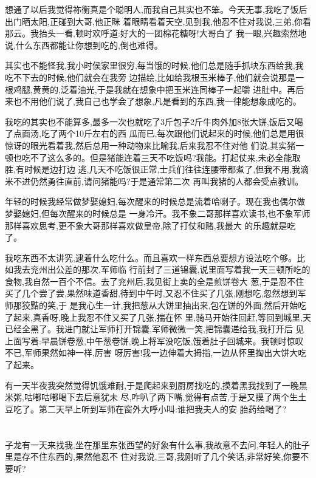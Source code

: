 ﻿\documentclass[12pt,twocolumn]{article}
\begin{document}
想通了以后我觉得祢衡真是个聪明人,而我自己其实也不笨。今天无事,我吃了饭后出门晒太阳,正碰到大哥,他正眯
着眼睛看着天空,见到我,他忍不住对我说,三弟,你看那云。我抬头一看,顿时欢呼道:好大的一团棉花糖呀!大哥白了
我一眼,兴趣索然地说,什么东西都能让你想到吃的,倒也难得。

其实也不能怪我,我小时侯家里很穷,每当饿的时候,他们总是随手抓块东西给我,我吃不下去的时候,他们就会在我旁
边描绘,比如给我根玉米棒子,他们就会说那是一根鸡腿,黄黄的,泛着油光,于是我就在想象中把玉米连同棒子一起嚼
进肚中。再后来也不用他们说了,我自己也学会了想象,凡是看到的东西,我一律能想象成吃的。

我吃的其实也不能算多,最多一次也就吃了3斤包子2斤牛肉外加8张大饼,饭后又喝了点面汤,吃了两个10斤左右的西
瓜而已,每次跟他们说起来的时候,他们总是用很惊讶的眼光看着我,然后总用一种动物来比喻我,后来我忍不住对他
们说,其实猪一顿也吃不了这么多的。但是猪能连着三天不吃饭吗?我能。打起仗来,未必全能取胜,有时候是边打边
逃,几天不吃饭很正常,士兵们往往连腰带都煮了,但我不用,我滴米不进仍然勇往直前,请问猪能吗?于是通常第二次
再叫我猪的人都会受点教训。

年轻的时候我经常做梦娶媳妇,每次醒来的时候总是流着哈喇子。现在我也偶尔做梦娶媳妇,但每次醒来的时候总是
一身冷汗。我不象二哥那样喜欢读书,也不象军师那样喜欢思考,更不象大哥那样喜欢做皇帝,除了打仗和赌,我最大
的乐趣就是吃了。

我吃东西不太讲究,逮着什么吃什么。而且喜欢一样东西总要想方设法吃个够。比如我去兖州出公差的那次,军师临
行前封了三道锦囊,说里面写着我一天三顿所吃的食物,我自然一百个不信。去了兖州后,我见街上卖的全是煎饼卷大
葱,于是忍不住买了几个尝了尝,果然味道香甜,待到中午时,又忍不住买了几张,刚想吃,忽然想到军师那狡黠的笑,于
是我心生一计,我把葱从大饼里抽出来,包在饼的外面,然后开始吃了起来,真香呀,晚上我忍不住又买了几张,揣在怀
里,骑马开始往回赶,等回到城里,天已经全黑了。我进门就让军师打开锦囊,军师微微一笑,把锦囊递给我,我打开后
见上面写着:早晨饼卷葱,中午葱卷饼,晚上将军没吃饭,饿着肚子回城来。我顿时惊叹不已,军师果然如神一样,厉害
呀厉害!我一边伸着大拇指,一边从怀里掏出大饼大吃了起来。

有一天半夜我突然觉得饥饿难耐,于是爬起来到厨房找吃的,摸着黑我找到了一晚黑米粥,咕嘟咕嘟喝下去后意犹未
尽,咋叭了两下嘴,觉得有点苦,于是又摸了两个生土豆吃了。第二天早上听到军师在窗外大呼小叫:谁把我夫人的安
胎药给喝了?

\section{}

子龙有一天来找我,坐在那里东张西望的好象有什么事,我故意不去问,年轻人的肚子里是存不住东西的,果然他忍不
住对我说,三哥,我刚听了几个笑话,非常好笑,你要不要听?
\end{document}
